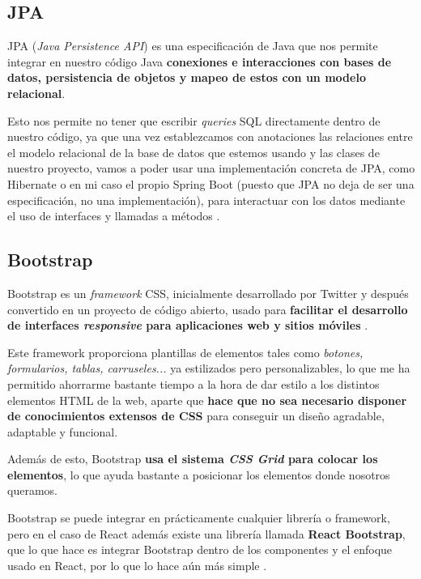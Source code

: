 \subsection{JPA}

JPA (\textit{Java Persistence API}) es una especificación de Java que nos permite integrar en nuestro código Java \textbf{conexiones e interacciones con bases de datos, persistencia de objetos y mapeo de estos con un modelo relacional}.

Esto nos permite no tener que escribir \textit{queries} SQL directamente dentro de nuestro código, ya que una vez establezcamos con anotaciones las relaciones entre el modelo relacional de la base de datos que estemos usando y las clases de nuestro proyecto, vamos a poder usar una implementación concreta de JPA, como  Hibernate o en mi caso el propio Spring Boot (puesto que JPA no deja de ser una especificación, no una implementación), para interactuar con los datos mediante el uso de interfaces y llamadas a métodos \cite{campusmvp:jpa}.


\subsection{Bootstrap}

Bootstrap es un \textit{framework} CSS, inicialmente desarrollado por Twitter y después convertido en un proyecto de código abierto, usado para \textbf{facilitar el desarrollo de interfaces \textit{responsive} para aplicaciones web y sitios móviles} \cite{w3schools:bootstrap}.

Este framework proporciona plantillas de elementos tales como \textit{botones, formularios, tablas, carruseles...} ya estilizados pero personalizables, lo que me ha permitido ahorrarme bastante tiempo a la hora de dar estilo a los distintos elementos HTML de la web, aparte que \textbf{hace que no sea necesario disponer de conocimientos extensos de CSS} para conseguir un diseño agradable, adaptable y funcional.

Además de esto, Bootstrap \textbf{usa el sistema \textit{CSS Grid} para colocar los elementos}, lo que ayuda bastante a posicionar los elementos donde nosotros queramos.

Bootstrap se puede integrar en prácticamente cualquier librería o framework, pero en el caso de React además existe una librería llamada \textbf{React Bootstrap}, que lo que hace es integrar Bootstrap dentro de los componentes y el enfoque usado en React, por lo que lo hace aún más simple \cite{react-bootstrap:main}.


